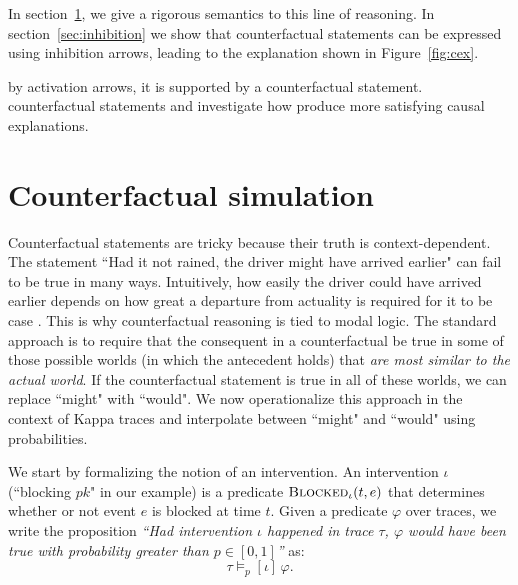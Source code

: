 In section~\ref{sec:counterfactual}, we give a rigorous semantics to
this line of reasoning. In section~\ref{sec:inhibition} we show that
counterfactual statements can be expressed using inhibition arrows,
leading to the explanation shown in Figure~\ref{fig:cex}.

by activation arrows, it is supported by a counterfactual statement.
counterfactual statements and investigate how %
produce more satisfying causal explanations.

\section{Counterfactual simulation}\label{sec:counterfactual}

Counterfactual statements are tricky because their truth is
context-dependent. The statement ``Had it not rained, the driver might
have arrived earlier" can fail to be true in many ways. Intuitively,
how easily the driver could have arrived earlier depends on how great
a departure from actuality is required for it to be case
\cite{Lewis1973}. This is why counterfactual reasoning is tied to
modal logic. The standard approach is to require that the consequent
in a counterfactual be true in some of those possible worlds (in which
the antecedent holds) that \textit{are most similar to the actual
  world}. If the counterfactual statement is true in all of these
worlds, we can replace ``might" with ``would".  We now operationalize
this approach in the context of Kappa traces and interpolate between
``might" and ``would" using probabilities.

We start by formalizing the notion of an intervention. An intervention
$\iota$ (``blocking $pk$" in our example) is a predicate
${\textsc{Blocked}}_{\iota}(t, e)$ that determines whether or not event $e$ is
blocked at time $t$. Given a predicate $\varphi$ over traces, we write
the proposition \textit{``Had intervention $\iota$ happened in trace
  $\tau$, $\varphi$ would have been true with probability greater than
  $p \in [0,1]$''} as:
\[ \tau \models_p [\iota] \, \varphi.
\]

